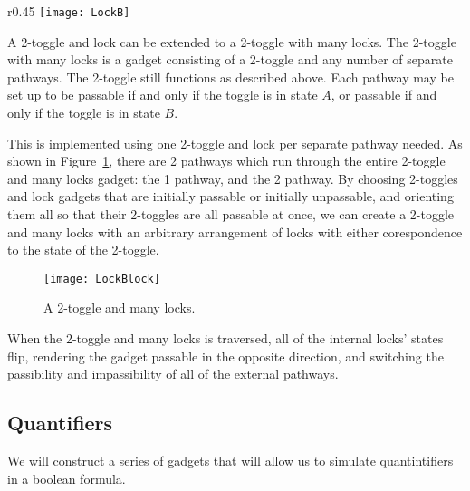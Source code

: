 \begin{wrapfigure}{r}{0.45\textwidth}
  \centering
    \texttt{[image: LockB]}
    \caption{Diagram of a lock. The $3a$ to $4a$ traversal is only possible in state $A$ and returns the toggle to state $A$.}
    \label{fig:LockA}
\end{wrapfigure}

A 2-toggle and lock can be extended to a 2-toggle with many locks. The 2-toggle with many locks is a gadget consisting of a 2-toggle
and any number of separate pathways. The 2-toggle still functions as described above.
Each pathway may be set up to be passable if and only if the toggle is in state $A$, or passable if and only if the toggle is in state $B$. 

This is
implemented using one 2-toggle and lock per separate pathway needed. As shown in Figure~\ref{fig:LockBlock}, there are 2
pathways which run through the entire 2-toggle and many locks gadget: the 1 pathway, and the 2 pathway. 
By choosing 2-toggles and lock gadgets that are initially passable or initially unpassable, and orienting them all so that 
their 2-toggles are all passable at once, we can create a 2-toggle and many locks with an arbitrary arrangement of locks with 
either corespondence to the state of the 2-toggle.
\begin{figure}[hb]
\centering
    \texttt{[image: LockBlock]}
    \caption{A 2-toggle and many locks.}
    \label{fig:LockBlock}
\end{figure}

When the 2-toggle and many locks is traversed, all of the internal locks' states flip, rendering the gadget passable in the opposite direction, and switching the passibility and impassibility of all of the external pathways.

\subsection{Quantifiers}

We will construct a series of gadgets that will allow us to simulate quantintifiers in a boolean formula.

